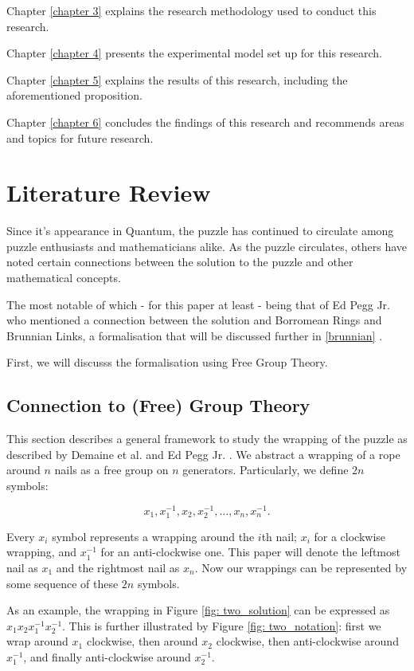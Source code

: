 \documentclass[12pt]{article}
\begin{document}
Chapter \ref{chapter 3} explains the research methodology used to conduct this research.

Chapter \ref{chapter 4} presents the experimental model set up for this research.

Chapter \ref{chapter 5} explains the results of this research, including the aforementioned proposition.

Chapter \ref{chapter 6} concludes the findings of this research and recommends areas and topics for future research.

\pagebreak
\section{Literature Review} \label{chapter 2}
Since it's appearance in Quantum, the puzzle has continued to circulate among puzzle enthusiasts and mathematicians alike.
As the puzzle circulates, others have noted certain connections between the solution to the puzzle and other mathematical concepts.

The most notable of which - for this paper at least - being that of Ed Pegg Jr. who mentioned a connection between the solution and Borromean Rings and Brunnian Links, 
a formalisation that will be discussed further in \ref{brunnian} \cite{Sillke2001StrangePainting}.

First, we will discusss the formalisation using Free Group Theory.

\subsection{Connection to (Free) Group Theory}
This section describes a general framework to study the wrapping of the puzzle as described by Demaine et al. \cite{Demaine_2013} and Ed Pegg Jr. \cite{PictureHanging}. 
We abstract a wrapping of a rope around $n$ nails as a free group on $n$ generators. 
Particularly, we define $2n$ symbols:

\[
x_1, x_1^{-1},x_2, x_2^{-1}, \dots , x_n, x_n^{-1}.
\]

Every $x_i$ symbol represents a wrapping around the $i$th nail; $x_i$ for a clockwise wrapping, and $x_1^{-1}$ for an anti-clockwise one.
This paper will denote the leftmost nail as $x_1$ and the rightmost nail as $x_n$.
Now our wrappings can be represented by some sequence of these $2n$ symbols. 

As an example, the wrapping in Figure \ref{fig: two_solution} can be expressed as $x_1 x_2 x_1^{-1} x_2^{-1}$. 
This is further illustrated by Figure \ref{fig: two_notation}: first we wrap around $x_1$ clockwise, then around $x_2$ clockwise, then anti-clockwise around $x_1^{-1}$, and finally anti-clockwise around $x_2^{-1}$.
\end{document}
